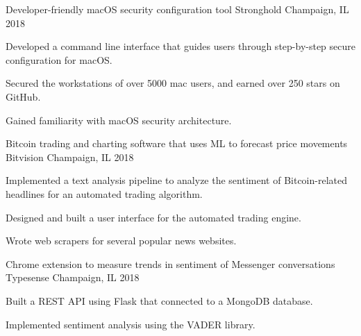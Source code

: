

\begin{cventries}
\cventry
{Developer-friendly macOS security configuration tool} %
{Stronghold} %
{Champaign, IL} %
{2018} %
{
	\begin{cvitems} %
		\item {Developed a command line interface that guides users through step-by-step secure configuration for macOS.}
		\item {Secured the workstations of over 5000 mac users, and earned over 250 stars on GitHub.}
		\item{Gained familiarity with macOS security architecture.} 
	\end{cvitems}
}
\cventry
{Bitcoin trading and charting software that uses ML to forecast price movements} %
{Bitvision} %
{Champaign, IL} %
{2018} %
{
	\begin{cvitems} %
		\item {Implemented a text analysis pipeline to analyze the sentiment of Bitcoin-related headlines for an automated trading algorithm.}
		\item {Designed and built a user interface for the automated trading engine.}
		\item{Wrote web scrapers for several popular news websites.} 
	\end{cvitems}
}

\cventry
{Chrome extension to measure trends in sentiment of Messenger conversations} %
{Typesense} %
{Champaign, IL} %
{2018} %
{
	\begin{cvitems} %
		\item{Built a REST API using Flask that connected to a MongoDB database.} 
		\item {Implemented sentiment analysis using the VADER library.}
	\end{cvitems}
}


\end{cventries}
